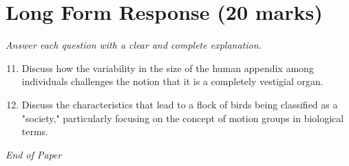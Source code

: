\documentclass[12pt]{article}
\begin{document}
\section*{Long Form Response (20 marks)}
\textit{Answer each question with a clear and complete explanation.}
\begin{enumerate}[label=\arabic*.]
\setcounter{enumi}{10}
\item Discuss how the variability in the size of the human appendix among individuals challenges the notion that it is a completely vestigial organ.
\item Discuss the characteristics that lead to a flock of birds being classified as a "society," particularly focusing on the concept of motion groups in biological terms.
\end{enumerate}

\vfill
\noindent\textit{End of Paper}
\end{document}
